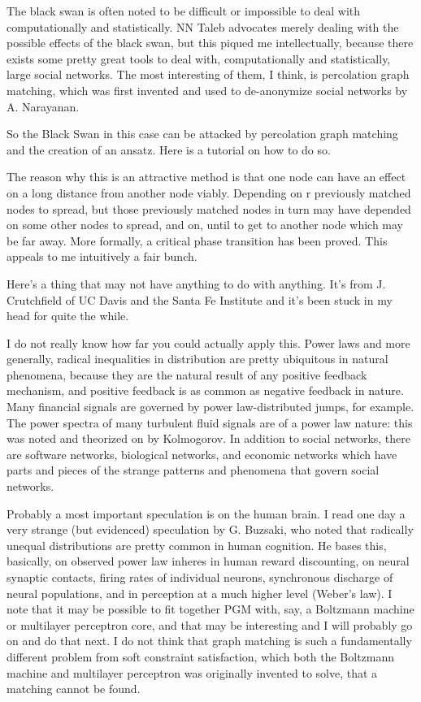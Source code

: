 \documentclass[12pt]{article}
\begin{document}
The black swan is often noted to be difficult or impossible to deal with computationally and statistically. NN Taleb advocates merely dealing with the possible effects of the black swan, but this piqued me intellectually, because there exists some pretty great tools to deal with, computationally and statistically, large social networks. The most interesting of them, I think, is percolation graph matching, which was first invented and used to de-anonymize social networks by A. Narayanan.

So the Black Swan in this case can be attacked by percolation graph matching and the creation of an ansatz. Here is a tutorial on how to do so.

The reason why this is an attractive method is that one node can have an effect on a long distance from another node viably. Depending on r previously matched nodes to spread, but those previously matched nodes in turn may have depended on some other nodes to spread, and on, until to get to another node which may be far away. More formally, a critical phase transition has been proved. This appeals to me intuitively a fair bunch.

Here's a thing that may not have anything to do with anything. It's from J. Crutchfield of UC Davis and the Santa Fe Institute and it's been stuck in my head for quite the while.

I do not really know how far you could actually apply this. Power laws and more generally, radical inequalities in distribution are pretty ubiquitous in natural phenomena, because they are the natural result of any positive feedback mechanism, and positive feedback is as common as negative feedback in nature. Many financial signals are governed by power law-distributed jumps, for example. The power spectra of many turbulent fluid signals are of a power law nature: this was noted and theorized on by Kolmogorov. In addition to social networks, there are software networks, biological networks, and economic networks which have parts and pieces of the strange patterns and phenomena that govern social networks.

Probably a most important speculation is on the human brain. I read one day a very strange (but evidenced) speculation by G. Buzsaki, who noted that radically unequal distributions are pretty common in human cognition. He bases this, basically, on observed power law inheres in human reward discounting, on neural synaptic contacts, firing rates of individual neurons, synchronous discharge of neural populations, and in perception at a much higher level (Weber's law). I note that it may be possible to fit together PGM with, say, a Boltzmann machine or multilayer perceptron core, and that may be interesting and I will probably go on and do that next. I do not think that graph matching is such a fundamentally different problem from soft constraint satisfaction, which both the Boltzmann machine and multilayer perceptron was originally invented to solve, that a matching cannot be found.
\end{document}

